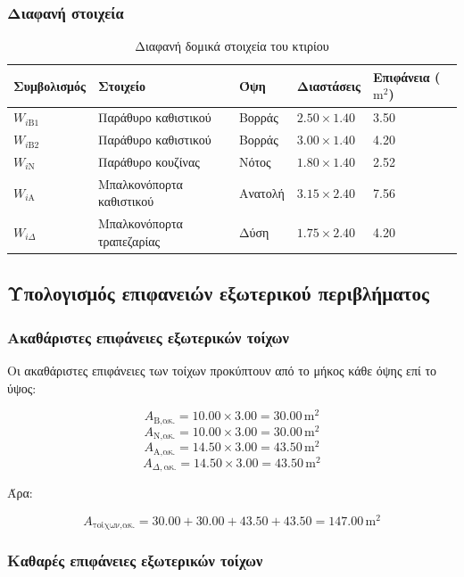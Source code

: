 \documentclass[12pt,a4paper]{article}
\begin{document}
\subsubsection{Διαφανή στοιχεία}

\begin{table}[H]
\centering
\small
\caption{Διαφανή δομικά στοιχεία του κτιρίου}
\begin{tabularx}{\textwidth}{C{2.6cm} L C{2.3cm} C{3.0cm} C{2.4cm}}
\toprule
\textbf{Συμβολισμός} & \textbf{Στοιχείο} & \textbf{Όψη} & \textbf{Διαστάσεις} & \textbf{Επιφάνεια (\(\mathrm{m^2}\))} \\
\midrule
\(W_{i\mathrm{B}1}\) & Παράθυρο καθιστικού & Βορράς & \(2.50 \times 1.40\) & 3.50 \\
\(W_{i\mathrm{B}2}\) & Παράθυρο καθιστικού & Βορράς & \(3.00 \times 1.40\) & 4.20 \\
\(W_{i\mathrm{N}}\) & Παράθυρο κουζίνας & Νότος & \(1.80 \times 1.40\) & 2.52 \\
\(W_{i\mathrm{A}}\) & Μπαλκονόπορτα καθιστικού & Ανατολή & \(3.15 \times 2.40\) & 7.56 \\
\(W_{i\Delta}\) & Μπαλκονόπορτα τραπεζαρίας & Δύση & \(1.75 \times 2.40\) & 4.20 \\
\bottomrule
\end{tabularx}
\end{table}

\subsection{Υπολογισμός επιφανειών εξωτερικού περιβλήματος}

\subsubsection{Ακαθάριστες επιφάνειες εξωτερικών τοίχων}

Οι ακαθάριστες επιφάνειες των τοίχων προκύπτουν από το μήκος κάθε όψης επί το ύψος:

\[
A_{\text{Β,ακ.}} = 10.00 \times 3.00 = 30.00\,\mathrm{m^2}
\]
\[
A_{\text{Ν,ακ.}} = 10.00 \times 3.00 = 30.00\,\mathrm{m^2}
\]
\[
A_{\text{Α,ακ.}} = 14.50 \times 3.00 = 43.50\,\mathrm{m^2}
\]
\[
A_{\Delta,\text{ακ.}} = 14.50 \times 3.00 = 43.50\,\mathrm{m^2}
\]

Άρα:

\[
A_{\text{τοίχων,ακ.}} = 30.00 + 30.00 + 43.50 + 43.50 = 147.00\,\mathrm{m^2}
\]

\subsubsection{Καθαρές επιφάνειες εξωτερικών τοίχων}
\end{document}
